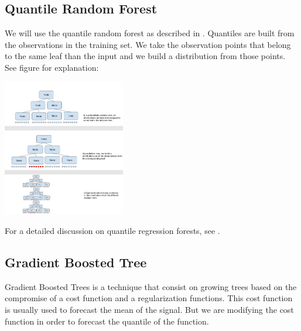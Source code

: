 \documentclass[a4paper,twocolumn,5p]{elsarticle}
\begin{document}
\subsection{Quantile Random Forest}

We will use the quantile random forest as described in \cite{randomforestdesc}. Quantiles are built 
from the observations in the training set. We take the observation points that belong to the 
same leaf than the input and we build a distribution from those points. See figure for explanation:

\includegraphics[width=0.4\textwidth]{quantile_random_forest}

For a detailed discussion on quantile regression forests, see
\cite{meinshausen_quantile_2006}.

\subsection{Gradient Boosted Tree}

Gradient Boosted Trees is a technique that consist on growing trees based on the compromise 
of a cost function and a regularization functions. This cost function is usually used to forecast 
the mean of the signal. But we are modifying the cost function 
in order to forecast the quantile of the function. 
\end{document}
